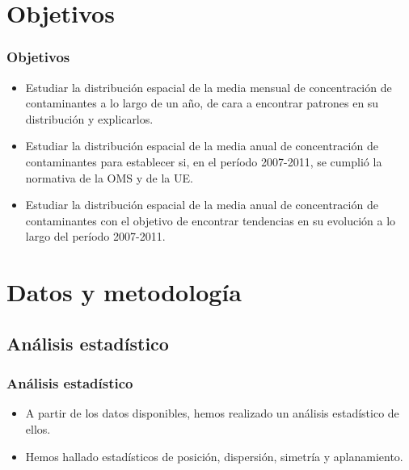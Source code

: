 \documentclass[12pt]{beamer}
\begin{document}
\section{Objetivos}
\begin{frame}
\frametitle{Objetivos}
\begin{itemize}
\item<1-> Estudiar la distribución espacial de la media mensual de concentración de contaminantes a lo largo de un año, de cara a encontrar patrones en su distribución y explicarlos.
\item<2-> Estudiar la distribución espacial de la media anual de concentración de contaminantes para establecer si, en el período 2007-2011, se cumplió la normativa de la OMS y de la UE.
\item<3-> Estudiar la distribución espacial de la media anual de concentración de contaminantes con el objetivo de encontrar tendencias en su evolución a lo largo del período 2007-2011.
\end{itemize}
\end{frame}

\section{Datos y metodología}
\subsection{Análisis estadístico}
\begin{frame}
\frametitle{Análisis estadístico}
\begin{itemize}
\item<1-> A partir de los datos disponibles, hemos realizado un análisis estadístico de ellos.
\item<2-> Hemos hallado estadísticos de posición, dispersión, simetría y aplanamiento.
\end{itemize}
\end{frame}
\end{document}
